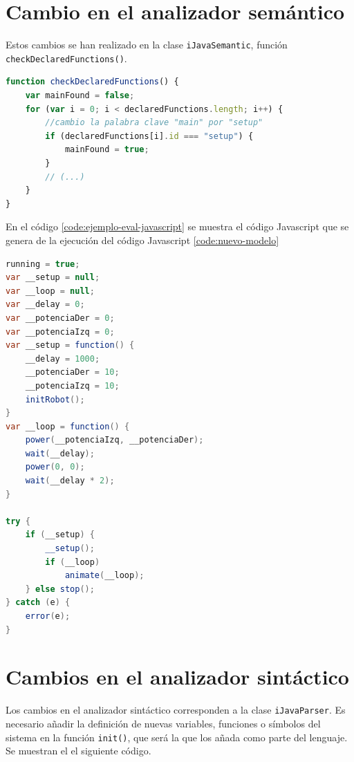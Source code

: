 \section*{Cambio en el analizador semántico}

Estos cambios se han realizado en la clase \texttt{iJavaSemantic}, función \texttt{checkDeclaredFunctions()}. 

\begin{lstlisting}[language={Javascript},label={code:cambios-ijava-semantico}, caption={Código que muestra los cambios que se han realizado en la clase \texttt{iJavaSemantic} para cambiar la función principal \texttt{main} por \texttt{setup}.}]
function checkDeclaredFunctions() {
	var mainFound = false;
	for (var i = 0; i < declaredFunctions.length; i++) {
		//cambio la palabra clave "main" por "setup"
		if (declaredFunctions[i].id === "setup") {
			mainFound = true;
		}
		// (...)
	}
}
\end{lstlisting}

En el código \ref{code:ejemplo-eval-javascript} se muestra el código Javascript que se genera de la ejecución del código Javascript \ref{code:nuevo-modelo}


\begin{lstlisting}[language={Java},label={code:ejemplo-eval-javascript}, caption={Ejemplo de código Javascript que se genera cuando se ejecuta el código iJava \ref{code:nuevo-modelo}.}]
running = true;
var __setup = null;
var __loop = null;
var __delay = 0;
var __potenciaDer = 0;
var __potenciaIzq = 0;
var __setup = function() {
    __delay = 1000;
    __potenciaDer = 10;
    __potenciaIzq = 10;
    initRobot();
}
var __loop = function() {
    power(__potenciaIzq, __potenciaDer);
    wait(__delay);
    power(0, 0);
    wait(__delay * 2);
}

try {
    if (__setup) {
        __setup();
        if (__loop)
            animate(__loop);
    } else stop();
} catch (e) {
    error(e);
}
\end{lstlisting}

\section*{Cambios en el analizador sintáctico}

Los cambios en el analizador sintáctico corresponden a la clase \texttt{iJavaParser}. Es necesario añadir la definición de nuevas variables, funciones o símbolos del sistema en la función \texttt{init()}, que será la que los añada como parte del lenguaje. Se muestran el el siguiente código.


